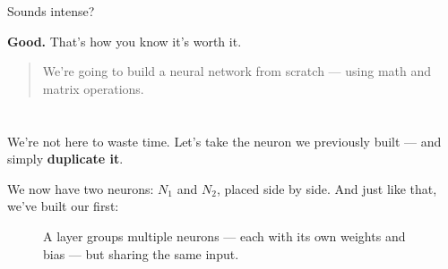 \documentclass[11pt]{article}
\begin{document}
\vspace{1em}

Sounds intense?

\vspace{0.5em}

\textbf{Good.} That’s how you know it’s worth it.

\vspace{1em}

\begin{quote}
We’re going to build a neural network from scratch — using math and matrix operations.
\end{quote}


\section*{}

\vspace{0.5em}

We’re not here to waste time.  
Let’s take the neuron we previously built — and simply \textbf{duplicate it}.

We now have two neurons: $N_1$ and $N_2$, placed side by side.  
And just like that, we’ve built our first:

\begin{center}
\end{center}

\vspace{1em}

\begin{figure}[H]
    \centering
    \caption{A layer groups multiple neurons — each with its own weights and bias — but sharing the same input.}
\end{figure}
\end{document}
